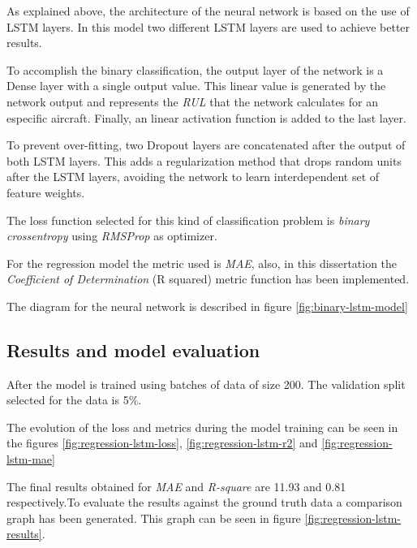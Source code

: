 As explained above, the architecture of the neural network is based on the use of LSTM layers. In this model two different LSTM layers are used to achieve better results.

To accomplish the binary classification, the output layer of the network is a Dense layer with a single output value. This linear value is generated by the network output and represents the \textit{RUL} that the network calculates for an especific aircraft. Finally, an linear activation function is added to the last layer.

To prevent over-fitting, two Dropout layers are concatenated after the output of both LSTM layers. This adds a regularization method that drops random units after the LSTM layers, avoiding the network to learn interdependent set of feature weights.

The loss function selected for this kind of classification problem is \textit{binary crossentropy} using \textit{RMSProp} as optimizer.

For the regression model the metric used is \textit{MAE}, also, in this dissertation the \textit{Coefficient of Determination} (R squared) metric function has been implemented.

The diagram for the neural network is described in figure \ref{fig:binary-lstm-model}


\subsection{Results and model evaluation}

After the model is trained using batches of data of size 200. The validation split selected for the data is 5\%.

The evolution of the loss and metrics during the model training can be seen in the figures \ref{fig:regression-lstm-loss}, \ref{fig:regression-lstm-r2} and \ref{fig:regression-lstm-mae}

The final results obtained for \textit{MAE} and \textit{R-square} are 11.93 and 0.81 respectively.To evaluate the results against the ground truth data a comparison graph has been generated. This graph can be seen in figure \ref{fig:regression-lstm-results}.

